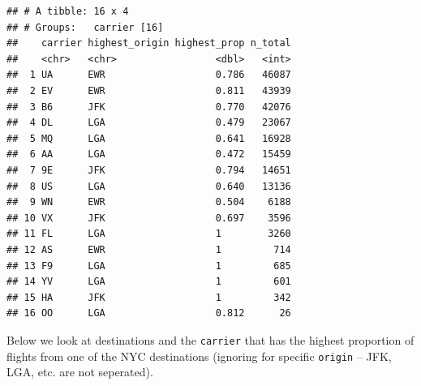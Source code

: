 \documentclass[]{book}
\newenvironment{Shaded}{\begin{snugshade}}{\end{snugshade}}
\newcommand{\DataTypeTok}[1]{\textcolor[rgb]{0.13,0.29,0.53}{#1}}
\newcommand{\DecValTok}[1]{\textcolor[rgb]{0.00,0.00,0.81}{#1}}
\newcommand{\KeywordTok}[1]{\textcolor[rgb]{0.13,0.29,0.53}{\textbf{#1}}}
\newcommand{\NormalTok}[1]{#1}
\newcommand{\OperatorTok}[1]{\textcolor[rgb]{0.81,0.36,0.00}{\textbf{#1}}}
\newcommand{\StringTok}[1]{\textcolor[rgb]{0.31,0.60,0.02}{#1}}
\theoremstyle{definition}
\theoremstyle{definition}
\theoremstyle{definition}
\theoremstyle{remark}
\begin{document}
\begin{verbatim}
## # A tibble: 16 x 4
## # Groups:   carrier [16]
##    carrier highest_origin highest_prop n_total
##    <chr>   <chr>                 <dbl>   <int>
##  1 UA      EWR                   0.786   46087
##  2 EV      EWR                   0.811   43939
##  3 B6      JFK                   0.770   42076
##  4 DL      LGA                   0.479   23067
##  5 MQ      LGA                   0.641   16928
##  6 AA      LGA                   0.472   15459
##  7 9E      JFK                   0.794   14651
##  8 US      LGA                   0.640   13136
##  9 WN      EWR                   0.504    6188
## 10 VX      JFK                   0.697    3596
## 11 FL      LGA                   1        3260
## 12 AS      EWR                   1         714
## 13 F9      LGA                   1         685
## 14 YV      LGA                   1         601
## 15 HA      JFK                   1         342
## 16 OO      LGA                   0.812      26
\end{verbatim}

Below we look at destinations and the \texttt{carrier} that has the
highest proportion of flights from one of the NYC destinations (ignoring
for specific \texttt{origin} -- JFK, LGA, etc. are not seperated).

\begin{Shaded}
\end{Shaded}
\end{document}
